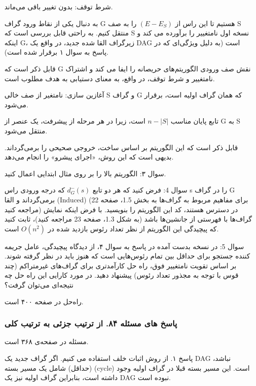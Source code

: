 \documentclass{book} %
\begin{document}
شرط توقف: بدون تغییر باقی می‌ماند.

به دنبال یکی از نقاط ورود گراف G هستیم تا این راس از $(E - E_{S} )$ را به صف S منتقل کنیم.
به راحتی قابل بررسی است که S نسخه اول نامتغییر را برآورده می کند و اینکه G، زیرگراف القا
شده جدید، در واقع یک DAG است (به دلیل ویژگی‌ای که در پاسخ به سوال ۱ برقرار شده است).

قابل ذکر است که G نقش صف ورودی الگوریتم‌های حریصانه را ایفا می کند و اشتراک نامتغییر و
شرط توقف، در واقع، به معنای دستیابی به هدف مطلوب است.

آغازین سازی: نامتغیر از صف خالی S
و گراف G که همان گراف اولیه است، برقرار می‌شود.

تابع پایان مناسب $n - |S|$ است، زیرا در هر مرحله از پیشرفت، یک عنصر از G به S منتقل می‌شود.

قابل ذکر است که این الگوریتم بر اساس ساخت، خروجی صحیحی را برمی‌گرداند. بدیهی است که این روش، «اجرای پیشرو» را انجام می‌دهد.

سوال ۳: الگوریتم بالا را بر روی مثال ابتدایی اعمال کنید.


سوال 4: فرض کنید که هر دو تابع $d^{-}_{G}(s)$ که درجه ورودی راس s را در گراف G برمی‌گرداند
و القا (Induced) (برای مفاهیم مربوط به گراف‌ها به بخش 1.5، صفحه 22 مراجعه کنید) در دسترس هستند،
کد این الگوریتم را بنویسید. با فرض اینکه نمایش گراف‌ها با فهرستی از جانشین‌ها باشد
(به شکل 1.3، صفحه 23 مراجعه کنید)، ثابت کنید که پیچیدگی این الگوریتم از نظر تعداد رئوس بازدید شده
در $O(n^{2})$ است.

سوال 5: در نسخه بدست آمده در پاسخ به سوال ۴، از دیدگاه پیچیدگی، عامل جریمه کننده
جستجو برای حداقل بین تمام رئوس‌هایی است که هنوز باید در نظر گرفته شوند. بر اساس تقویت نامتغییر فوق، راه حل کارآمدتری برای گراف‌های غیرمتراکم (چند قوس با توجه به مجذور تعداد رئوس) پیشنهاد دهید. در مورد کارایی
این راه حل چه نتیجه‌ای می‌توان گرفت؟

راه‌حل در صفحه ۴۰۰ است.

\newpage

\subsubsection*{پاسخ های مسئله ۸۴. از ترتیب جزئی به ترتیب کلی}
مسئله در صفحه‌ی ۳۶۸ است.

پاسخ ۱. از روش اثبات خلف استفاده می کنیم. اگر گراف جدید یک DAG نباشد،
(حداقل) شامل یک مسیر بسته (cycle) است. این مسیر بسته قبلا در گراف اولیه وجود داشته
است، بنابراین گراف اولیه نیز یک DAG نبوده است.
\end{document}
